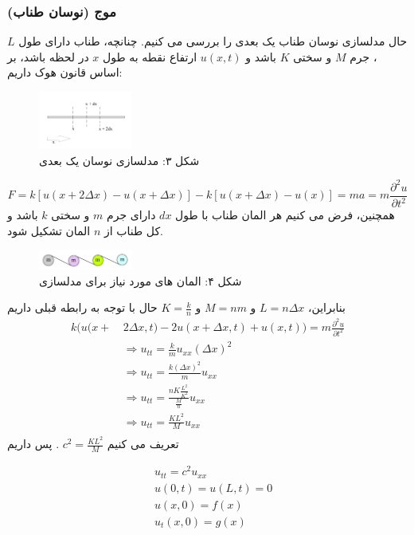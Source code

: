 \subsubsection{موج (نوسان طناب)}
حال مدلسازی نوسان طناب یک بعدی را بررسی می کنیم. چنانچه، طناب دارای طول $L$، جرم $M$ و سختی $K$ باشد و $u(x,t)$ ارتفاع نقطه به طول $x$ در لحظه باشد، بر اساس قانون هوک داریم:
\begin{figure}[H]
	\centering
	\includegraphics[width=0.275\textwidth]{im03.jpg}
	\caption*{شکل ۳: مدلسازی نوسان یک بعدی\\
		\large{
		}
	}
\end{figure}
\[
F=k[u(x+2\Delta x)-u(x+\Delta x)]-k[u(x+\Delta x)-u(x)]=ma=m\frac{\partial^2 u}{\partial t^2}
\]
همچنین، فرض می کنیم هر المان طناب با طول $dx$ دارای جرم $m$ و سختی $k$ باشد و کل طناب از $n$ المان تشکیل شود.
\begin{figure}[H]
	\centering
	\includegraphics[width=0.275\textwidth]{im04.jpg}
	\caption*{شکل ۴: المان های مورد نیاز برای مدلسازی\\
		\large{
		}
	}
\end{figure}
بنابراین، 
$L=n\Delta x$
و
$M=nm$
و
$K=\frac{k}{n}$
حال با توجه به رابطه قبلی داریم
\begin{equation*}
	\begin{aligned}
		k\Big(u(x+{}&\ 2\Delta x,t)- 2u(x+\Delta x,t)+u(x,t)\Big)=m\frac{\partial^2 u}{\partial t^2}\\
		&\  \Rightarrow  u_{tt}=\frac{k}{m}u_{xx}(\Delta x)^2\\
		&\  \Rightarrow u_{tt}=\frac{k(\Delta x)^2}{m}u_{xx}\\ 
		&\ \Rightarrow u_{tt}=\frac{nK\frac{L^2}{K^2}}{\frac{M}{n}}u_{xx}\\
		&\  \Rightarrow u_{tt}=\frac{KL^2}{M}u_{xx} \\
	\end{aligned}
\end{equation*}
تعریف می کنیم
$c^2 = \frac{KL^2}{M}$
.
پس داریم

\begin{equation*}
	\begin{aligned}
		{}&\ u_{tt}=c^2u_{xx} \\
		&\ u(0,t)=u(L,t)=0 \\
		&\ u(x,0)=f(x) \\
		&\ u_t(x,0)=g(x) \\
	\end{aligned}
\end{equation*}

